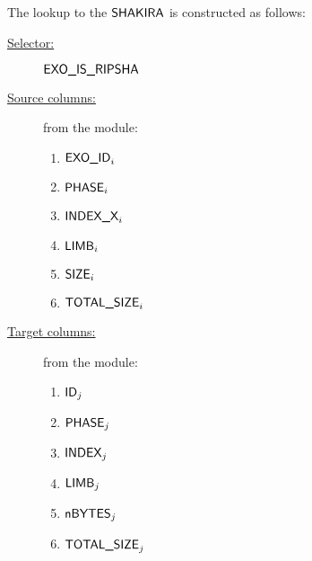The lookup to the $\textsf{SHAKIRA}$ is constructed as follows:
\begin{description}
	\item[\underline{Selector:}] $\textsf{EXO\_IS\_RIPSHA}$
	\item[\underline{Source columns:}] from the \mmioMod{} module:
		\begin{multicols}{3}
			\begin{enumerate}
				\item $\textsf{EXO\_ID}_{i}$
				\item $\textsf{PHASE}_{i}$
				\item $\textsf{INDEX\_X}_{i}$
				\item $\textsf{LIMB}_{i}$
				\item $\textsf{SIZE}_{i}$
				\item $\textsf{TOTAL\_SIZE}_{i}$
			\end{enumerate}
		\end{multicols}
	\item[\underline{Target columns:}] from the \shakiraMod{} module: 
		\begin{multicols}{3}
			\begin{enumerate}
				\item $\textsf{ID}_{j}$
				\item $\textsf{PHASE}_{j}$
				\item $\textsf{INDEX}_{j}$
				\item $\textsf{LIMB}_{j}$
				\item $\textsf{nBYTES}_{j}$
				\item $\textsf{TOTAL\_SIZE}_{j}$
			\end{enumerate}
		\end{multicols}
\end{description}
